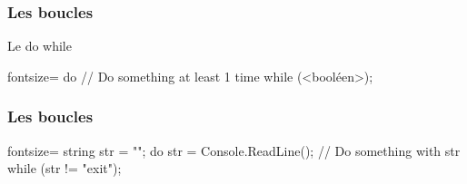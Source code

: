 \begin{frame}[fragile]
  \frametitle{Les boucles}

  \begin{center}{\large Le do while}\end{center}
  \begin{csharpcode*}{fontsize=\scriptsize}
    do
    {
      // Do something at least 1 time
    } while (<booléen>);
  \end{csharpcode*}
\end{frame}

\begin{frame}[fragile]
  \frametitle{Les boucles}

  \begin{csharpcode*}{fontsize=\scriptsize}
    string str = "";
    do
    {
      str = Console.ReadLine();
      // Do something with str
    } while (str != "exit");
  \end{csharpcode*}
\end{frame}


